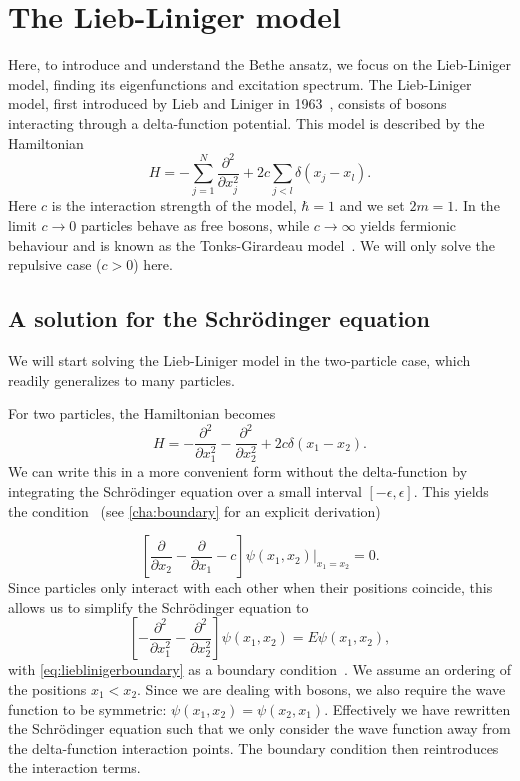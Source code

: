 \documentclass[11pt, a4paper]{report} %
\begin{document}
\section{The Lieb-Liniger model}

Here, to introduce and understand the Bethe ansatz, we focus on the Lieb-Liniger model, finding its eigenfunctions and excitation spectrum.
The Lieb-Liniger model, first introduced by Lieb and Liniger in 1963~\cite{Lieb1963, Lieb1963a}, consists of bosons interacting through a delta-function potential.
This model is described by the Hamiltonian
\begin{equation}
	H = - \sum_{j=1}^{N} \frac{\partial^2}{\partial x_j^2} + 2c \sum_{j<l} \delta(x_j - x_l).
\end{equation}
Here \(c\) is the interaction strength of the model, \(\hbar=1\) and we set \(2m=1\).
In the limit \(c\to0\) particles behave as free bosons, while \(c\to\infty\) yields fermionic behaviour and is known as the Tonks-Girardeau model~\cite{Lieb1963, Franchini2017}.
We will only solve the repulsive case (\(c > 0\)) here.

\subsection{A solution for the Schrödinger equation}

We will start solving the Lieb-Liniger model in the two-particle case, which readily generalizes to many particles.

For two particles, the Hamiltonian becomes
\begin{equation}
	H =  - \frac{\partial^2}{\partial x_1^2} - \frac{\partial^2}{\partial x_2^2} + 2c \delta(x_1 - x_2).
\end{equation}
We can write this in a more convenient form without the delta-function by integrating the Schrödinger equation over a small interval \([-\epsilon,\epsilon]\).
This yields the condition~\cite{Lieb1963} (see \cref{cha:boundary} for an explicit derivation)

\begin{equation}\label{eq:lieblinigerboundary}
	\left[\frac{\partial}{\partial x_2} - \frac{\partial}{\partial x_1} - c\right] \psi(x_1, x_2)\bigg\rvert_{x_1 = x_2} = 0.
\end{equation}
Since particles only interact with each other when their positions coincide, this allows us to simplify the Schrödinger equation to
\begin{equation}\label{eq:lieblinigersimple}
	\left[- \frac{\partial^2}{\partial x_1^2} - \frac{\partial^2}{\partial x_2^2}\right] \psi(x_1, x_2) = E \psi(x_1,x_2),
\end{equation}
with \cref{eq:lieblinigerboundary} as a boundary condition~\cite{Lieb1963}.
We assume an ordering of the positions \(x_1 < x_2\).
Since we are dealing with bosons, we also require the wave function to be symmetric: \(\psi(x_1,x_2) = \psi(x_2,x_1)\).
Effectively we have rewritten the Schrödinger equation such that we only consider the wave function away from the delta-function interaction points.
The boundary condition then reintroduces the interaction terms.
\end{document}
